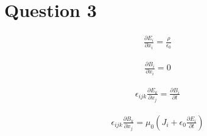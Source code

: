 \documentclass[paper=a4, fontsize=12pt]{scrartcl}
\begin{document}
\section*{Question 3}
\begin{align*}
\frac{\partial E_i}{\partial x_i} = \frac{\rho}{\epsilon_0}
\end{align*}

\begin{align*}
\frac{\partial B_i}{\partial x_i} = 0
\end{align*}

\begin{align*}
\epsilon_{ijk}\frac{\partial E_k}{\partial x_j} = \frac{\partial B_i}{\partial t}
\end{align*}

\begin{align*}
\epsilon_{ijk}\frac{\partial B_k}{\partial x_j} = \mu_0(J_i + \epsilon_0 \frac{\partial E_i}{\partial t})
\end{align*}
	
	
\end{document}
